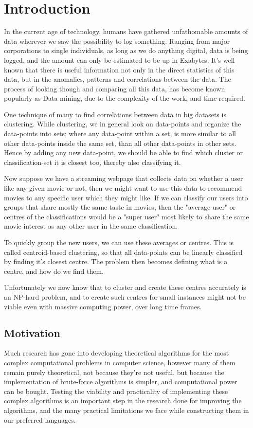 \documentclass[a4paper]{article}
\begin{document}
%
%
\section{Introduction}
\label{sec:intro}
In the current age of technology, humans have gathered unfathomable amounts of data wherever
we saw the possibility to log something. Ranging from major corporations to single individuals,
as long as we do anything digital, data is being logged, and the amount can only be estimated to be
up in Exabytes.
It's well known that there is useful information not only in the direct statistics of this data,
but in the anomalies, patterns and correlations between the data. The process of looking though and
comparing all this data, has become known popularly as Data mining, due to the complexity of the work,
and time required.

One technique of many to find correlations between data in big datasets is clustering. While
clustering, we in general look on data-points and organize the data-points
into sets; where any data-point within a set, is more similar to all other data-points inside
the same set, than all other data-points in other sets. Hence by adding any new
data-point, we should be able to find which cluster or classification-set it is closest too,
thereby also classifying it. \cite{gan07}

Now suppose we have a streaming webpage that collects data on whether a user like any given movie or not,
then we might want to use this data to recommend movies to any specific user which they might like.
If we can classify our users into groups that share mostly the same taste in movies, then
the "average-user" or centres of the classifications would be a "super user" most likely to share the same movie
interest as any other user in the same classification.

To quickly group the new users, we can use these averages or centres. This is called centroid-based
clustering, so that all data-points can be linearly classified by finding it's closest centre.
The problem then becomes defining what is a centre, and how do we find them.

Unfortunately we now know that to cluster and create these centres accurately is an NP-hard problem,
and to create such centres for small instances might not be viable even with massive computing power,
over long time frames.

\subsection{Motivation}
Much research has gone into developing theoretical algorithms for the most complex computational
problems in computer science, however many of them remain purely theoretical, not because
they're not useful, but because the implementation of brute-force algorithms is simpler, and
computational power can be bought. Testing the viability and practicality of implementing
these complex algorithms is an important step in the research done for improving the
algorithms, and the many practical limitations we face while constructing them in our
preferred languages.
\end{document}
